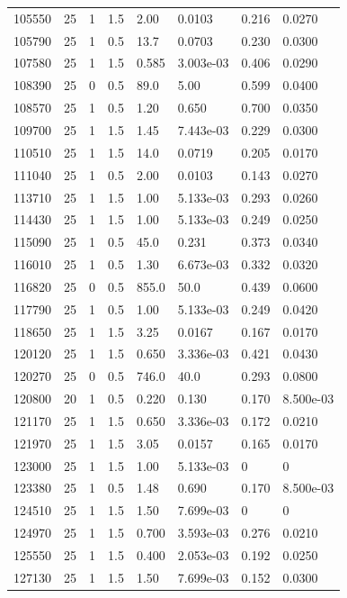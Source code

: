 \documentclass[preview]{standalone}
\begin{document}
{{{{{\begin{tabular}{L{1.2cm}C{1.2cm} C{0.3cm}C{0.5cm} C{1.4cm}C{1.4cm} C{1.4cm}C{1.4cm}}
  105550  &    25  & 1     & 1.5 &  2.00  & 0.0103  & 0.216 &  0.0270   \\ 
  105790  &    25  & 1     & 0.5 &  13.7  & 0.0703  & 0.230 &  0.0300   \\ 
  107580  &    25  & 1     & 1.5 &  0.585  & 3.003e-03  & 0.406 &  0.0290   \\ 
  108390  &    25  & 0     & 0.5 &  89.0  & 5.00  & 0.599 &  0.0400   \\ 
  108570  &    25  & 1     & 0.5 &  1.20  & 0.650  & 0.700 &  0.0350   \\ 
  109700  &    25  & 1     & 1.5 &  1.45  & 7.443e-03  & 0.229 &  0.0300   \\ 
  110510  &    25  & 1     & 1.5 &  14.0  & 0.0719  & 0.205 &  0.0170   \\ 
  111040  &    25  & 1     & 0.5 &  2.00  & 0.0103  & 0.143 &  0.0270   \\ 
  113710  &    25  & 1     & 1.5 &  1.00  & 5.133e-03  & 0.293 &  0.0260   \\ 
  114430  &    25  & 1     & 1.5 &  1.00  & 5.133e-03  & 0.249 &  0.0250   \\ 
  115090  &    25  & 1     & 0.5 &  45.0  & 0.231  & 0.373 &  0.0340   \\ 
  116010  &    25  & 1     & 0.5 &  1.30  & 6.673e-03  & 0.332 &  0.0320   \\ 
  116820  &    25  & 0     & 0.5 &  855.0  & 50.0  & 0.439 &  0.0600   \\ 
  117790  &    25  & 1     & 0.5 &  1.00  & 5.133e-03  & 0.249 &  0.0420   \\ 
  118650  &    25  & 1     & 1.5 &  3.25  & 0.0167  & 0.167 &  0.0170   \\ 
  120120  &    25  & 1     & 1.5 &  0.650  & 3.336e-03  & 0.421 &  0.0430   \\ 
  120270  &    25  & 0     & 0.5 &  746.0  & 40.0  & 0.293 &  0.0800   \\ 
  120800  &    20  & 1     & 0.5 &  0.220  & 0.130  & 0.170 &  8.500e-03   \\ 
  121170  &    25  & 1     & 1.5 &  0.650  & 3.336e-03  & 0.172 &  0.0210   \\ 
  121970  &    25  & 1     & 1.5 &  3.05  & 0.0157  & 0.165 &  0.0170   \\ 
  123000  &    25  & 1     & 1.5 &  1.00  & 5.133e-03  & 0 &  0   \\ 
  123380  &    25  & 1     & 0.5 &  1.48  & 0.690  & 0.170 &  8.500e-03   \\ 
  124510  &    25  & 1     & 1.5 &  1.50  & 7.699e-03  & 0 &  0   \\ 
  124970  &    25  & 1     & 1.5 &  0.700  & 3.593e-03  & 0.276 &  0.0210   \\ 
  125550  &    25  & 1     & 1.5 &  0.400  & 2.053e-03  & 0.192 &  0.0250   \\ 
  127130  &    25  & 1     & 1.5 &  1.50  & 7.699e-03  & 0.152 &  0.0300   \\ 
\hline 
\end{tabular} 

}}}}}
\end{document}
